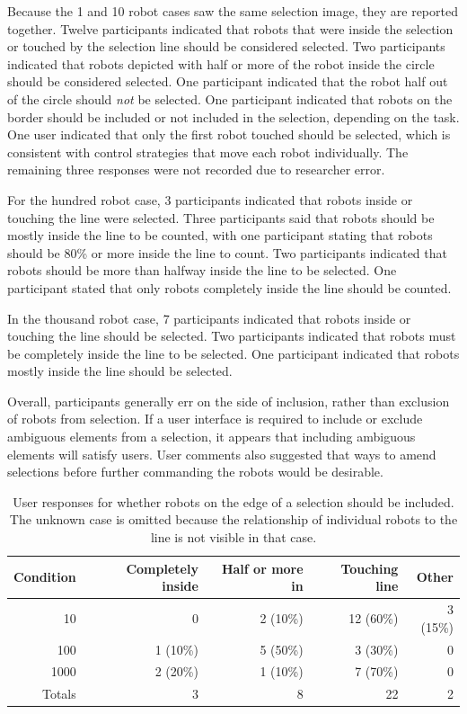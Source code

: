 Because the 1 and 10 robot cases saw the same selection image, they are reported together. 
Twelve participants indicated that robots that were inside the selection or touched by the selection line should be considered selected. 
Two participants indicated that robots depicted with half or more of the robot inside the circle should be considered selected. 
One participant indicated that the robot half out of the circle should \emph{not} be selected. 
One participant indicated that robots on the border should be included or not included in the selection, depending on the task. %
One user indicated that only the first robot touched should be selected, which is consistent with control strategies that move each robot individually. 
The remaining three responses were not recorded due to researcher error. 

For the hundred robot case, 3 participants indicated that robots inside or touching the line were selected. 
Three participants said that robots should be mostly inside the line to be counted, with one participant stating that robots should be 80\% or more inside the line to count. 
Two participants indicated that robots should be more than halfway inside the line to be selected. 
One participant stated that only robots completely inside the line should be counted. %

In the thousand robot case, 7 participants indicated that robots inside or touching the line should be selected. 
Two participants indicated that robots must be completely inside the line to be selected. 
One participant indicated that robots mostly inside the line should be selected. 

Overall, participants generally err on the side of inclusion, rather than exclusion of robots from selection.
If a user interface is required to include or exclude ambiguous elements from a selection, it appears that including ambiguous elements will satisfy users. 
User comments also suggested that ways to amend selections before further commanding the robots would be desirable.

\begin{table}
\centering
\begin{tabular}{ r r r r r}
	Condition & Completely inside & Half or more in & Touching line & Other\\
	\hline
	10 & 0 & 2 (10\%) & 12 (60\%) & 3 (15\%)\\
	
	100 & 1 (10\%) & 5 (50\%) & 3 (30\%) & 0 \\
	1000 & 2 (20\%) & 1 (10\%) & 7 (70\%) & 0\\
	\hline
	Totals & 3 & 8 & 22 & 2 \\
\end{tabular}
\caption{User responses for whether robots on the edge of a selection should be included. The unknown case is omitted because the relationship of individual robots to the line is not visible in that case. }
\end{table}

